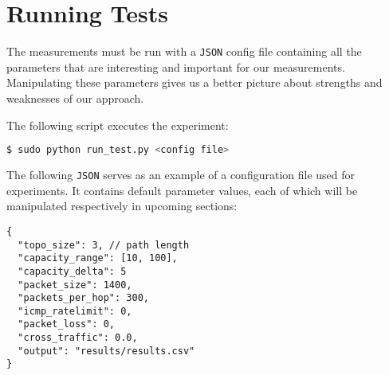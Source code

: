 \section{Running Tests}
The measurements must be run with a \texttt{JSON} config file containing all the parameters that are interesting and important for our measurements. Manipulating these parameters gives us a better picture about strengths and weaknesses of our approach.

The following script executes the experiment:
\begin{lstlisting}[language=bash]
  $ sudo python run_test.py <config file>
\end{lstlisting}

The following \texttt{JSON} serves as an example of a configuration file used for experiments.
It contains default parameter values, each of which will be manipulated respectively in upcoming sections:
\begin{lstlisting}
{    
  "topo_size": 3, // path length
  "capacity_range": [10, 100],			
  "capacity_delta": 5
  "packet_size": 1400,
  "packets_per_hop": 300,
  "icmp_ratelimit": 0,
  "packet_loss": 0,
  "cross_traffic": 0.0,
  "output": "results/results.csv"
}
\end{lstlisting}

